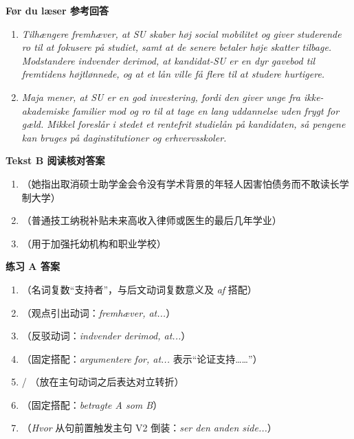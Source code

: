 \begin{answerbox}
\textbf{Før du læser 参考回答}
\begin{enumerate}
  \item \textit{Tilhængere fremhæver, at SU skaber høj social mobilitet og giver studerende ro til at fokusere på studiet, samt at de senere betaler høje skatter tilbage. Modstandere indvender derimod, at kandidat-SU er en dyr gavebod til fremtidens højtlønnede, og at et lån ville få flere til at studere hurtigere.}
  \item \textit{Maja mener, at SU er en god investering, fordi den giver unge fra ikke-akademiske familier mod og ro til at tage en lang uddannelse uden frygt for gæld. Mikkel foreslår i stedet et rentefrit studielån på kandidaten, så pengene kan bruges på daginstitutioner og erhvervsskoler.}
\end{enumerate}

\textbf{Tekst B 阅读核对答案}
\begin{enumerate}
  \item {}（她指出取消硕士助学金会令没有学术背景的年轻人因害怕债务而不敢读长学制大学）
  \item {}（普通技工纳税补贴未来高收入律师或医生的最后几年学业）
  \item {}（用于加强托幼机构和职业学校）
\end{enumerate}

\textbf{练习 A 答案}
\begin{enumerate}
  \item {}（名词复数“支持者”，与后文动词复数意义及 \textit{af} 搭配）
  \item {}（观点引出动词：\textit{fremhæver, at...}）
  \item {}（反驳动词：\textit{indvender derimod, at...}）
  \item {}（固定搭配：\textit{argumentere for, at...} 表示“论证支持……”）
  \item {} / （放在主句动词之后表达对立转折）
  \item {}（固定搭配：\textit{betragte A som B}）
  \item {}（\textit{Hvor} 从句前置触发主句 V2 倒装：\textit{ser den anden side...}）
\end{enumerate}


\end{answerbox}
